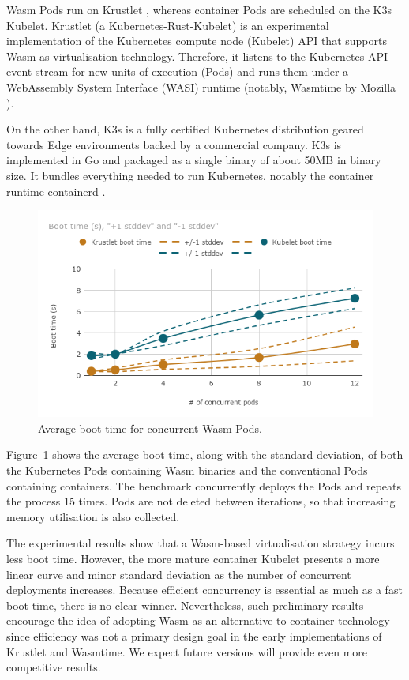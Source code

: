 Wasm Pods run on Krustlet \cite{krustlet}, whereas container Pods are scheduled on the K3s \cite{k3s} Kubelet. Krustlet (a Kubernetes-Rust-Kubelet) is an experimental implementation of the Kubernetes compute node (Kubelet) API that supports Wasm as virtualisation technology. Therefore, it listens to the Kubernetes API event stream for new units of execution (Pods) and runs them under a WebAssembly System Interface (WASI) runtime (notably, Wasmtime by Mozilla \cite{wasmtime}).

On the other hand, K3s is a fully certified Kubernetes distribution geared towards Edge environments backed by a commercial company. K3s is implemented in Go and packaged as a single binary of about 50MB in binary size. It bundles everything needed to run Kubernetes, notably the container runtime containerd \cite{containerd}.

\begin{figure}[ht]
\centering
\includegraphics[width=\columnwidth]{figures/b-krustlet-1}
\caption{Average boot time for concurrent Wasm Pods.}
\label{fig:b-krustlet-1}
\end{figure}

Figure~\ref{fig:b-krustlet-1} shows the average boot time, along with the standard deviation, of both the Kubernetes Pods containing Wasm binaries and the conventional Pods containing containers. The benchmark concurrently deploys the Pods and repeats the process 15 times. Pods are not deleted between iterations, so that increasing memory utilisation is also collected.

The experimental results show that a Wasm-based virtualisation strategy incurs less boot time. However, the more mature container Kubelet presents a more linear curve and minor standard deviation as the number of concurrent deployments increases. Because efficient concurrency is essential as much as a fast boot time, there is no clear winner. Nevertheless, such preliminary results encourage the idea of adopting Wasm as an alternative to container technology since efficiency was not a primary design goal in the early implementations of Krustlet and Wasmtime. We expect future versions will provide even more competitive results.

